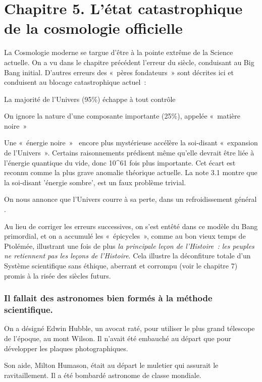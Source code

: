 \documentclass[a4paper,12pt]{article}
\begin{document}
\section{Chapitre 5. L'état catastrophique de la cosmologie officielle}

La Cosmologie moderne se targue d'être à la pointe extr\^eme de la Science actuelle. On a vu dans le chapitre précédent l’erreur du siècle, conduisant au Big Bang initial. D’autres erreurs des « pères fondateurs » sont décrites ici  et conduisent au blocage catastrophique actuel :

La majorité de l’Univers (95\%) échappe à tout contrôle

On ignore la nature d’une composante importante (25\%), appelée « matière noire »

Une « énergie noire »  encore plus mystérieuse accélère la soi-disant « expansion de l’Univers ». Certains raisonnements prédisent  même qu’elle devrait être liée à l’énergie quantique du vide, donc 10^61 fois plus importante. Cet écart est reconnu comme la plus grave anomalie théorique actuelle.
La note 3.1 montre que la soi-disant 'énergie sombre', est un faux problème trivial. 

On nous annonce que l’Univers courre à sa perte, dans un refroidissement général . 

Au lieu de corriger les erreurs successives, on s’est ent\^eté dans ce modèle du Bang primordial, et on a accumulé les « épicycles », comme au bon vieux temps de Ptolémée, illustrant une fois de plus \textit{la principale leçon de l'Histoire : les peuples ne retiennent pas les leçons de l'Histoire}. Cela illustre la déconfiture totale d'un Système scientifique sans éthique,  aberrant et corrompu (voir le chapitre 7) promis à  la risée des siècles futurs.



\subsubsection{Il fallait des astronomes bien formés à la méthode scientifique.}

 On a désigné Edwin Hubble, un avocat raté, pour utiliser le plus grand télescope de l’époque, au mont Wilson. Il n’avait été embauché au départ que pour développer les plaques photographiques.


 Son aide, Milton Humason, était au départ le muletier qui assurait le ravitaillement. Il a  été bombardé astronome de classe mondiale.
\end{document}
